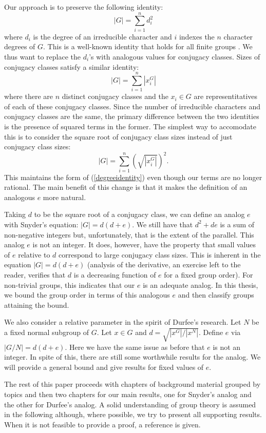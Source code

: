 \documentclass[main.tex]{subfiles}
\begin{document}
Our approach is to preserve the following identity:
\begin{equation}\label{degreeidentity}
|G| = \sum_{i=1}^n d_i^2
\end{equation}
where $d_i$ is the degree of an irreducible character and $i$ indexes the $n$ character degrees of $G$. This is a well-known identity that holds for all finite groups \cite{gorensteinfinitegroups}. We thus want to replace the $d_i$'s with analogous values for conjugacy classes. Sizes of conjugacy classes satisfy a similar identity:
$$|G| = \sum_{i=1}^n |x_i^G|$$
where there are $n$ distinct conjugacy classes and the $x_i \in G$ are representitatives of each of these conjugacy classes. Since the number of irreducible characters and conjugacy classes are the same, the primary difference between the two identities is the presence of squared terms in the former. The simplest way to accomodate this is to consider the square root of conjugacy class sizes instead of just conjugacy class sizes:
$$|G| = \sum_{i=1}^n \left(\sqrt{|x_i^G|}\right)^2\text{.}$$
This maintains the form of (\ref{degreeidentity}) even though our terms are no longer rational. The main benefit of this change is that it makes the definition of an analogous $e$ more natural.

Taking $d$ to be the square root of a conjugacy class, we can define an analog $e$ with Snyder's equation: $|G| = d(d+e)$. We still have that  $d^2 + de$ is a sum of non-negative integers but, unfortunately, that is the extent of the parallel. This analog $e$ is not an integer. It does, however, have the property that small values of $e$ relative to $d$ correspond to large conjugacy class sizes. This is inherent in the equation $|G| = d(d + e)$ (analysis of the derivative, an exercise left to the reader, verifies that $d$ is a decreasing function of $e$ for a fixed group order). For non-trivial groups, this indicates that our $e$ is an adequate analog. In this thesis, we bound the group order in terms of this analogous $e$ and then classify groups attaining the bound.

We also consider a relative parameter in the spirit of Durfee's research. Let $N$ be a fixed normal subgroup of $G$. Let $x \in G$ and $d = \sqrt{|x^G|/|x^N|}$. Define $e$ via $|G/N| = d(d+e)$. Here we have the same issue as before that $e$ is not an integer. In spite of this, there are still some worthwhile results for the analog. We will provide a general bound and give results for fixed values of $e$.

The rest of this paper proceeds with chapters of background material grouped by topics and then two chapters for our main results, one for Snyder's analog and the other for Durfee's analog. A solid understanding of group theory is assumed in the following although, where possible, we try to present all supporting results. When it is not feasible to provide a proof, a reference is given.
\end{document}
